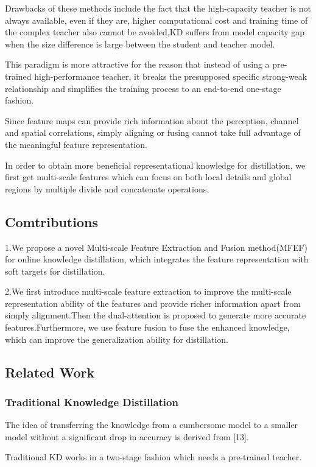 \documentclass[11pt]{article}
\begin{document}
Drawbacks of these methods include the fact that the high-capacity teacher is not always available, even if they are, higher computational cost and training time of the complex teacher also cannot be avoided,KD suffers from model capacity gap when the size difference is large between the student and teacher model.

This paradigm is more attractive for the reason that instead of using a pre-trained high-performance teacher, it breaks the presupposed specific strong-weak relationship and simplifies the training process to an end-to-end one-stage fashion.

Since feature maps can provide rich information about the perception, channel and spatial correlations, simply aligning or fusing cannot take full advantage of the meaningful feature representation.

In order to obtain more beneficial representational knowledge for distillation, we first get multi-scale features which can focus on both local details and global regions by multiple divide and concatenate operations. 
\subsection{Comtributions}
1.We propose a novel Multi-scale Feature Extraction and Fusion method(MFEF) for online knowledge distillation, which integrates the feature representation with soft targets for distillation.

2.We first introduce multi-scale feature extraction to improve the multi-scale representation ability of the features and provide richer information apart from simply alignment.Then the dual-attention is proposed to generate more accurate features.Furthermore, we use feature fusion to fuse the enhanced knowledge, which can improve the generalization ability for distillation.

\subsection{Related Work}
\subsubsection{Traditional Knowledge Distillation}
The idea of transferring the knowledge from a cumbersome model to a smaller model
without a significant drop in accuracy is derived from [13]. 

Traditional KD works in a two-stage fashion which needs a pre-trained teacher. 
\end{document}
